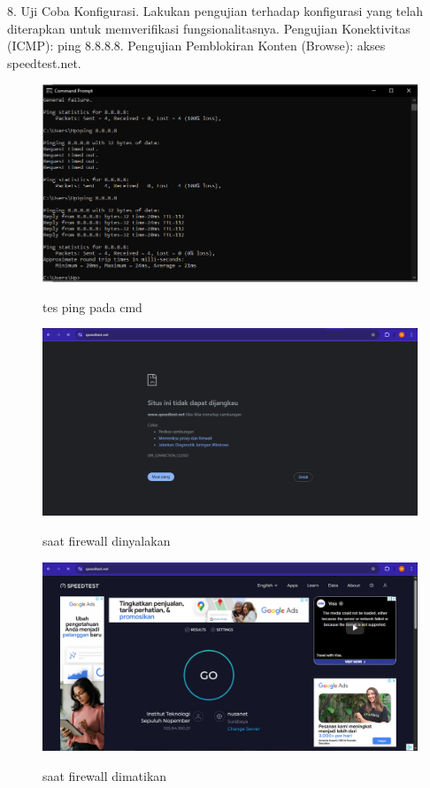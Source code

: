 8. Uji Coba Konfigurasi. Lakukan pengujian terhadap konfigurasi yang telah diterapkan untuk memverifikasi fungsionalitasnya. Pengujian Konektivitas (ICMP): ping 8.8.8.8. Pengujian Pemblokiran Konten (Browse): akses speedtest.net. 
\begin{figure}[H]
    \centering
    \includegraphics[width=0.65\linewidth]{image/bdg4.png}
    \label{fig:inirujukan}
    \caption{tes ping pada cmd}
\end{figure}
\begin{figure}[H]
    \centering
    \includegraphics[width=0.65\linewidth]{image/bdg5.png}
    \label{fig:inirujukan}
    \caption{saat firewall dinyalakan}
\end{figure}
\begin{figure}[H]
    \centering
    \includegraphics[width=0.65\linewidth]{image/bdg6.png}
    \label{fig:inirujukan}
    \caption{saat firewall dimatikan}
\end{figure}

